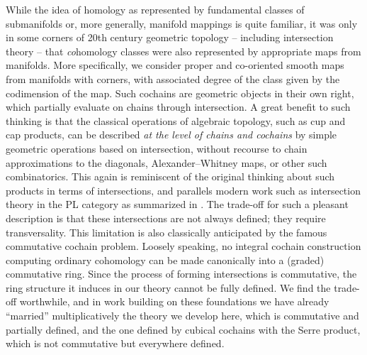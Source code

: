 While the idea of homology as represented by fundamental classes of submanifolds or, more generally, manifold mappings is quite familiar, it was only in some corners of 20th century geometric topology -- including intersection theory -- that \textit{co}homology classes were also represented by appropriate maps from manifolds.
More specifically, we consider proper and co-oriented smooth maps from manifolds with corners, with associated degree of the class given by the codimension of the map.
Such cochains are geometric objects in their own right, which partially evaluate on chains through intersection.
A great benefit to such thinking is that the classical operations of algebraic topology, such as cup and cap products, can be described \textit{at the level of chains and cochains} by simple geometric operations based on intersection, without recourse to chain approximations to the diagonals, Alexander--Whitney maps, or other such combinatorics.
This again is reminiscent of the original thinking about such products in terms of intersections, and parallels modern work such as intersection theory in the PL category as summarized in \cite{McC06}.
The trade-off for such a pleasant description is that these intersections are not always defined; they require transversality.
This limitation is also classically anticipated by the famous commutative cochain problem.
Loosely speaking, no integral cochain construction computing ordinary cohomology can be made canonically into a (graded) commutative ring.
Since the process of forming intersections is commutative, the ring structure it induces in our theory cannot be fully defined.
We find the trade-off worthwhile, and in work building on these foundations \cite{FMS-flows} we have already ``married'' multiplicatively the theory we develop here, which is commutative and partially defined, and the one defined by cubical cochains with the Serre product, which is not commutative but everywhere defined.

